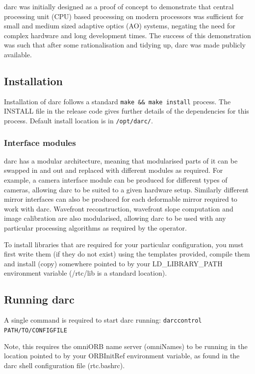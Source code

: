 \documentclass[a4,10pt]{article}
\newcommand{\ao}{adaptive optics (AO)\renewcommand{\ao}{AO\xspace}\xspace}
\newcommand{\cpu}{central processing unit
  (CPU)\renewcommand{\cpu}{CPU\xspace}\xspace}
\begin{document}
darc was initially designed as a proof of concept to demonstrate that
\cpu based processing on modern processors was sufficient for small
and medium sized \ao systems, negating the need for complex hardware
and long development times.  The success of this demonstration was
such that after some rationalisation and tidying up, darc was made
publicly available.

\subsection{Installation}
Installation of darc follows a standard {\tt make \&\& make install}
process.  The INSTALL file in the release code gives further details
of the dependencies for this process.  Default install location is in
{\tt /opt/darc/}.  

\subsubsection{Interface modules}
darc has a modular architecture, meaning that modularised parts of it
can be swapped in and out and replaced with different modules as
required.  For example, a camera interface module can be produced for
different types of cameras, allowing darc to be suited to a given
hardware setup.  Similarly different mirror interfaces can also be
produced for each deformable mirror required to work with darc.
Wavefront reconstruction, wavefront slope computation and image
calibration are also modularised, allowing darc to be used with any
particular processing algorithms as required by the operator.

To install libraries that are required for your particular
configuration, you must first write them (if they do not exist) using
the templates provided, compile them and install (copy) somewhere pointed to
by your LD\_LIBRARY\_PATH environment variable (/rtc/lib is a standard
location).

\subsection{Running darc}
A single command is required to start darc running: 
{\tt darccontrol PATH/TO/CONFIGFILE}

Note, this requires the omniORB name server (omniNames) to be running in the
location pointed to by your ORBInitRef environment variable, as found
in the darc shell configuration file (rtc.bashrc).
\end{document}

